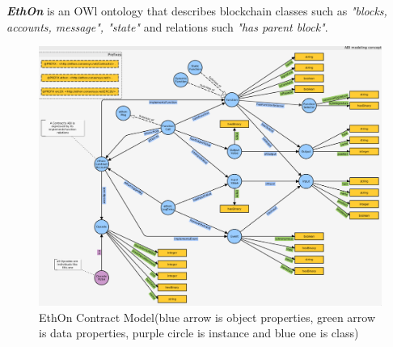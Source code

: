 \textbf{\textit{EthOn}} is an OWl ontology that describes blockchain classes such as \textit{"blocks, accounts, message", "state"} and relations such \textit{"has parent block"}\cite{Rashid}. 
\begin{center}
	
	\begin{figure}[htb!]
		
		\begin{minipage}{0.50\linewidth}
			\centering
			\includegraphics[width=1.80\textwidth]{images/chap2_EthOnContract.png}
		\end{minipage}
		\caption[EthOn classes]{EthOn Contract Model(blue arrow is object properties, green arrow is data properties, purple circle is instance and blue one is class)\cite{Rashid}}
		
	\end{figure}
	
	\begin{figure}[htb!]
		

\end{figure}
\end{center}
